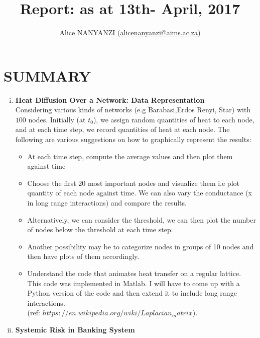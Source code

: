 \documentclass[10pt,a4paper]{article}
\author{Alice NANYANZI (\href{mailto:alicenanyanzi@aims.ac.za}{alicenanyanzi@aims.ac.za})}
\title{Report: as at 13th- April, 2017}
\begin{document}
\maketitle
\section*{SUMMARY }
\begin{enumerate}[i)]
\item \textbf{Heat Diffusion Over a Network: Data Representation}\\

Considering various kinds of networks (e.g Barabasi,Erdos Renyi, Star) with $100$ nodes. Initially (at $t_0$), we assign random quantities of heat to each node, and at each time step, we record quantities of heat at each node. The following are various suggestions on how to graphically represent the results:\\
\begin{itemize}
\item At each time step, compute the average values and then plot them against time
\item Choose the first $20$ most important nodes and visualize them i.e plot quantity of each node against time. We can also vary the conductance (x in long range interactions) and compare the results.
\item  Alternatively, we can consider the threshold, we can then plot the number of nodes below the threshold at each time step.
\item Another possibility may be to categorize nodes in groups of 10 nodes and then have plots of them accordingly.
\item Understand the code that animates heat transfer  on a regular lattice. This code was implemented in Matlab. I will have to come up with a Python version of the code and then extend it to include long range interactions.\\
(ref: $https://en.wikipedia.org/wiki/Laplacian_matrix$).  
\end{itemize}
\item \textbf{Systemic Risk in Banking System} \\


\end{enumerate}
\end{document}
